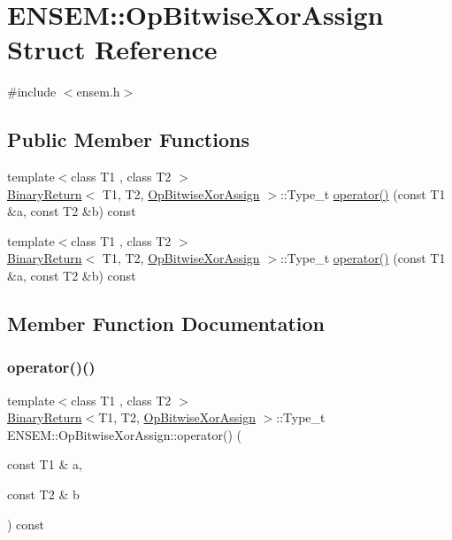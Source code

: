 \hypertarget{structENSEM_1_1OpBitwiseXorAssign}{}\section{E\+N\+S\+EM\+:\+:Op\+Bitwise\+Xor\+Assign Struct Reference}
\label{structENSEM_1_1OpBitwiseXorAssign}


{\ttfamily \#include $<$ensem.\+h$>$}

\subsection*{Public Member Functions}
\begin{DoxyCompactItemize}
\item 
{\footnotesize template$<$class T1 , class T2 $>$ }\\\mbox{\hyperlink{structENSEM_1_1BinaryReturn}{Binary\+Return}}$<$ T1, T2, \mbox{\hyperlink{structENSEM_1_1OpBitwiseXorAssign}{Op\+Bitwise\+Xor\+Assign}} $>$\+::Type\+\_\+t \mbox{\hyperlink{structENSEM_1_1OpBitwiseXorAssign_a4052fafdb4677ce5a429ae23383ed469}{operator()}} (const T1 \&a, const T2 \&b) const
\item 
{\footnotesize template$<$class T1 , class T2 $>$ }\\\mbox{\hyperlink{structENSEM_1_1BinaryReturn}{Binary\+Return}}$<$ T1, T2, \mbox{\hyperlink{structENSEM_1_1OpBitwiseXorAssign}{Op\+Bitwise\+Xor\+Assign}} $>$\+::Type\+\_\+t \mbox{\hyperlink{structENSEM_1_1OpBitwiseXorAssign_a4052fafdb4677ce5a429ae23383ed469}{operator()}} (const T1 \&a, const T2 \&b) const
\end{DoxyCompactItemize}


\subsection{Member Function Documentation}
\mbox{\label{structENSEM_1_1OpBitwiseXorAssign_a4052fafdb4677ce5a429ae23383ed469}} 
\subsubsection{\texorpdfstring{operator()()}{operator()()}\hspace{0.1cm}{\footnotesize\ttfamily [1/2]}}
{\footnotesize\ttfamily template$<$class T1 , class T2 $>$ \\
\mbox{\hyperlink{structENSEM_1_1BinaryReturn}{Binary\+Return}}$<$T1, T2, \mbox{\hyperlink{structENSEM_1_1OpBitwiseXorAssign}{Op\+Bitwise\+Xor\+Assign}} $>$\+::Type\+\_\+t E\+N\+S\+E\+M\+::\+Op\+Bitwise\+Xor\+Assign\+::operator() (\begin{DoxyParamCaption}\item[{const T1 \&}]{a,  }\item[{const T2 \&}]{b }\end{DoxyParamCaption}) const\hspace{0.3cm}{\ttfamily [inline]}}

